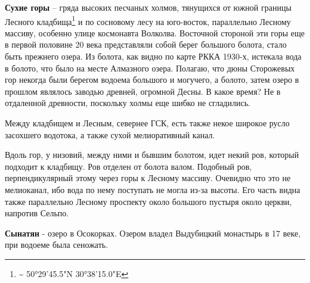

\textbf{Сухие горы} – гряда высоких песчаных холмов, тянущихся от южной границы Лесного кладбища\footnote{\textasciitilde{} 50°29'45.5"N 30°38'15.0"E} и по сосновому лесу на юго-восток, параллельно Лесному массиву, особенно улице космонавта Волколва. Восточной стороной эти горы еще в первой половине 20 века представляли собой берег большого болота, стало быть прежнего озера. Из болота, как видно по карте РККА 1930-х, истекала вода в болото, что было на месте Алмазного озера. Полагаю, что дюны Сторожевых гор некогда были берегом водоема большого и могучего, а болото, затем озеро в прошлом являлось заводью древней, огромной Десны. В какое время? Не в отдаленной древности, поскольку холмы еще шибко не сгладились.

Между кладбищем и Лесным, севернее ГСК, есть также некое широкое русло засохшего водотока, а также сухой мелиоративный канал. 

Вдоль гор, у низовий, между ними и бывшим болотом, идет некий ров, который подходит к кладбищу. Ров отделен от болота валом. 
Подобный ров, перпендикулярный этому через горы к Лесному массиву. Очевидно что это не мелиоканал, ибо вода по нему поступать не могла из-за высоты. Его часть видна также параллельно Лесному проспекту около большого пустыря около церкви, напротив Сельпо.

\medskip
 
\textbf{Сынатян} - озеро в Осокорках. Озером владел Выдубицкий монастырь в 17 веке, при водоеме была сеножать.\\
